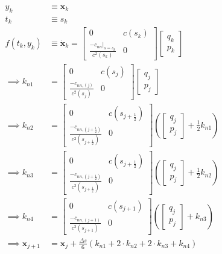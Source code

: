 \documentclass{article}
\begin{document}
\begin{align*}
	y_{k}                 & \equiv\bm{x}_k                                                                                                                                                                                                            \\
	t_k                   & \equiv s_k                                                                                                                                                                                                                \\
	f(t_k, y_k)           & \equiv\dot{\bm{x}}_k=\begin{bmatrix} 0 & c(s_k) \\ \frac{-c_{nn}|_{s=s_k}}{c^2(s_k)} & 0\end{bmatrix}\begin{bmatrix} q_k \\ p_k\end{bmatrix}                                                                              \\ {}
	\implies k_{n1}       & = \begin{bmatrix} 0 & c(s_j) \\ \frac{-c_{nn, (j)}}{c^2(s_j)} & 0\end{bmatrix}\begin{bmatrix} q_j \\ p_j\end{bmatrix}                                                                                                     \\
	\implies k_{n2}       & = \begin{bmatrix} 0 & c(s_{j+\frac{1}{2}}) \\ \frac{-c_{nn, (j+\frac{1}{2})}}{c^2(s_{j + \frac{1}{2}})} & 0\end{bmatrix}\left(\begin{bmatrix} q_j \\ p_j\end{bmatrix} + \frac{1}{2}k_{n1} \right) \\
	\implies k_{n3}       & = \begin{bmatrix} 0 & c(s_{j+\frac{1}{2}}) \\ \frac{-c_{nn, (j+\frac{1}{2})}}{c^2(s_{j + \frac{1}{2}})} & 0\end{bmatrix}\left(\begin{bmatrix} q_j \\ p_j\end{bmatrix} + \frac{1}{2}k_{n2} \right) \\
	\implies k_{n4}       & = \begin{bmatrix} 0 & c(s_{j+1}) \\ \frac{-c_{nn, (j+1)}}{c^2(s_{j + 1})} & 0\end{bmatrix}\left(\begin{bmatrix} q_j \\ p_j\end{bmatrix} + k_{n3} \right)                                                                  \\
	\implies \bm{x}_{j+1} & = \bm{x}_{j} + \frac{\Delta s}{6}\left(k_{n1} + 2\cdot k_{n2} + 2\cdot k_{n3} + k_{n4} \right)
\end{align*}
\end{document}
